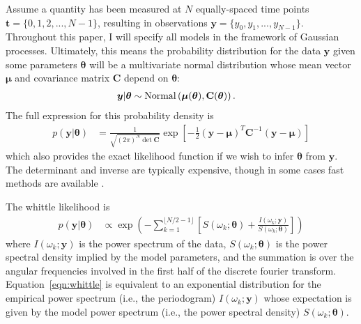 \documentclass[a4paper, 12pt]{article}
\begin{document}
Assume a quantity has been measured at $N$ equally-spaced time points
$\boldsymbol{t} = \{0, 1, 2, ..., N-1\}$, resulting in observations
$\boldsymbol{y} = \{y_0, y_1, ..., y_{N-1}\}$.
Throughout this paper, I will specify all models in the framework of
Gaussian processes. Ultimately, this means the probability distribution for
the data $\boldsymbol{y}$ given some parameters $\boldsymbol{\theta}$ will
be a multivariate normal distribution whose mean vector $\boldsymbol{\mu}$
and covariance matrix $\mathbf{C}$ depend on $\boldsymbol{\theta}$:
\begin{align}
\boldsymbol{y} | \boldsymbol{\theta} &\sim
    \textnormal{Normal}\left(\boldsymbol{\mu}(\boldsymbol{\theta}),
                             \mathbf{C}(\boldsymbol{\theta})\right).
\end{align}
The full expression for this probability density is
\begin{align}
p(\boldsymbol{y} | \boldsymbol{\theta})
    &= \frac{1}{\sqrt{(2\pi)^N\det \mathbf{C}}}
        \exp\left[-\frac{1}{2}
                    (\boldsymbol{y} - \boldsymbol{\mu})^T
                    \mathbf{C}^{-1}
                    (\boldsymbol{y} - \boldsymbol{\mu})\right]
\end{align}
which also provides the exact likelihood function if we wish to infer
$\boldsymbol{\theta}$ from $\boldsymbol{y}$. The determinant and inverse
are typically expensive, though in some cases fast methods are available
\citep[e.g.][]{mackay, hodlr, celerite}.

The whittle likelihood is
\begin{align}
p(\boldsymbol{y} | \boldsymbol{\theta})
    &\propto \exp\left(-\sum_{k=1}^{\lfloor N/2 - 1 \rfloor}
         \left[S(\omega_k; \boldsymbol{\theta})
         + \frac{I(\omega_k; \boldsymbol{y})}
                {S(\omega_k; \boldsymbol{\theta})}\right]
                \right)
\label{eqn:whittle}
\end{align}
where $I(\omega_k; \boldsymbol{y})$ is the power spectrum of the data,
$S(\omega_k; \boldsymbol{\theta})$ is the power spectral density implied
by the model parameters, and the summation is over the angular frequencies
involved in the first half of the discrete fourier transform.
Equation~\ref{eqn:whittle} is equivalent to an exponential distribution
for the empirical power spectrum (i.e., the periodogram)
$I(\omega_k; \boldsymbol{y})$ whose expectation is given by the
model power spectrum (i.e., the power spectral density)
$S(\omega_k; \boldsymbol{\theta})$.
\end{document}

